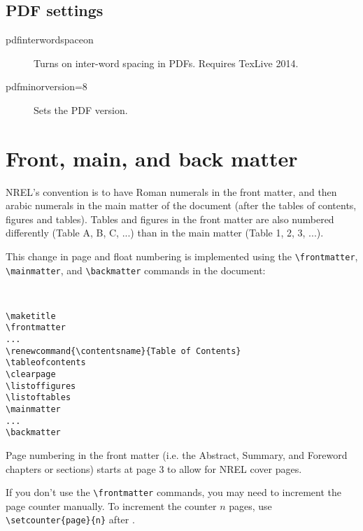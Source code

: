 \subsection{PDF settings}
\begin{description}
\item[pdfinterwordspaceon]{Turns on inter-word spacing in PDFs. Requires TexLive 2014.}
\item[pdfminorversion=8]{Sets the PDF version.}
\end{description}

\section{Front, main, and back matter}
NREL's convention is to have Roman numerals in the front matter, and then arabic numerals in the main matter of the document (after the tables of contents, figures and tables). Tables and figures in the front matter are also numbered differently (Table A, B, C, ...) than in the main matter (Table 1, 2, 3, ...).

This change in page and float numbering is implemented using the \verb+\frontmatter+, \verb+\mainmatter+, and \verb+\backmatter+ commands in the document:

\begin{verbatim}


\maketitle
\frontmatter
...
\renewcommand{\contentsname}{Table of Contents}
\tableofcontents
\clearpage
\listoffigures
\listoftables
\mainmatter
...
\backmatter

\end{verbatim}

Page numbering in the front matter (i.e. the Abstract, Summary, and Foreword chapters or sections) starts at page 3 to allow for NREL cover pages.

If you don't use the \verb+\frontmatter+ commands, you may need to increment the page counter manually. To increment the counter $n$ pages, use \verb+\setcounter{page}{n}+ after \verb++.


